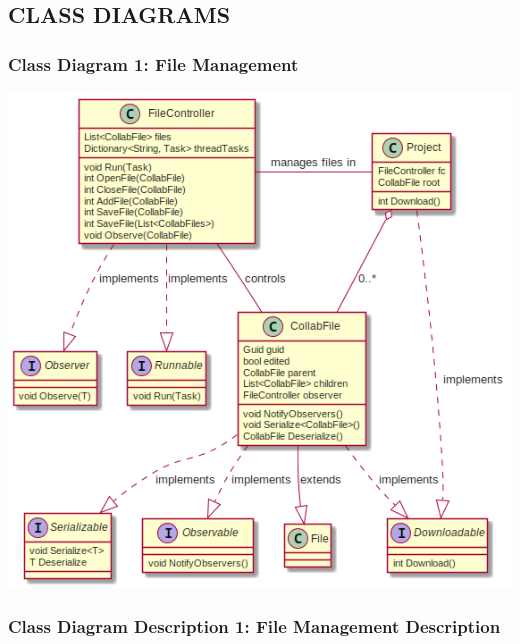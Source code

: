 \documentclass[twoside,letterpaper]{article}
\begin{document}
\subsection[Class Diagrams]{\rmfamily\bfseries\color{black} CLASS DIAGRAMS}
\hypertarget{RefHeading21659017292}{}{\color{black}

\subsubsection[Class Diagram 1: File Management]{\rmfamily\bfseries\color{black}
	Class Diagram 1: File Management}
\hypertarget{RefHeading22059017292}{}
\bigskip

\includegraphics[width=\textwidth]{images/ClassDiagrams/FileManagement}

\newpage

\subsubsection[Class Diagram Description 1: File Management Description]{\rmfamily\bfseries\color{black}
	Class Diagram Description 1: File Management Description}
\hypertarget{RefHeading22059017292}{}

}
\end{document}
